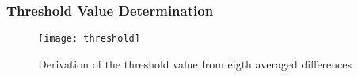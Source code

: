 \subsubsection{Threshold Value Determination}
\label{subsubsec:threshold}


\begin{figure}[H]
  \centering
  \texttt{[image: threshold]}
  \caption{Derivation of the threshold value from eigth averaged differences} %
  \label{fig:threshold}
\end{figure}
